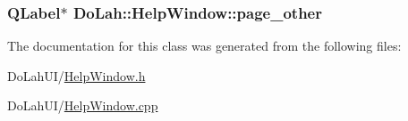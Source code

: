 \subsubsection[{page\+\_\+other}]{\setlength{\rightskip}{0pt plus 5cm}Q\+Label$\ast$ Do\+Lah\+::\+Help\+Window\+::page\+\_\+other}\label{class_do_lah_1_1_help_window_ae95510d5027171260f759d7b7645cf04}


The documentation for this class was generated from the following files\+:\begin{DoxyCompactItemize}
\item 
Do\+Lah\+U\+I/\hyperlink{_help_window_8h}{Help\+Window.\+h}\item 
Do\+Lah\+U\+I/\hyperlink{_help_window_8cpp}{Help\+Window.\+cpp}\end{DoxyCompactItemize}
